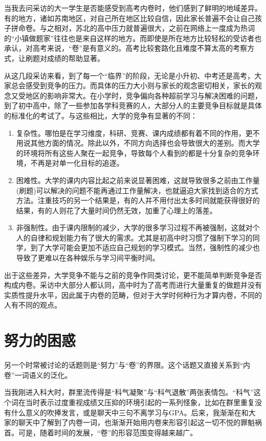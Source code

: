 \documentclass[UTF8,a4paper,fontset=windows,11pt,openany]{ctexbook}
\begin{document}
当我去问采访的大一学生是否能感受到高考内卷时，他们感到了鲜明的地域差异。有的地方，诸如苏南地区，对自己所在地区比较自信，因此家长普遍不会让自己孩子拼命卷。与之相对，苏北的高中压力就普遍很大，之前在网络上一度成为热词的“小镇做题家”往往也是来自这样的地方。而即使是所在地方比较轻松的受访者也承认，对高考来说，“卷”是有意义的。高考比较套路化且难度不算太高的考察方式，让刷题对成绩的帮助显著。

从这几段采访来看，到了每一个“临界”的阶段，无论是小升初、中考还是高考，大家总会感受到竞争的压力。而具体的压力大小则与家长的观念密切相关，家长的观念又受地区的影响非常大。在小学时，竞争偏向各种超前学习与解决困难的问题，到了初中高中，除了一些参加各学科竞赛的人，大部分人的主要竞争目标就是具体的标准化的考试了。与这些相比，大学的竞争有显著的不同：
\begin{enumerate}
    \item 复杂性。哪怕是在学习维度，科研、竞赛、课内成绩都有着不同的作用，更不用说其他方面的情况。除此以外，不同方向选择也会导致很大的差别。而大学的环境将所有这些人聚在一起竞争，导致每个人看到的都是十分复杂的竞争环境，不再是对单一化目标的追逐。
    \item 困难性。大学的课内内容比起之前来说显著困难，这就导致很多之前由工作量(刷题)可以解决的问题不能再通过工作量解决，也就逼迫大家找到适合的方式方法。注重技巧的另一个结果是，有的人并不用付出太多时间就能获得很好的结果，有的人则花了大量时间仍然无效，加重了心理上的落差。
    \item 非强制性。由于课内限制的减少，大学的很多学习过程不再被强制，这就对个人的自律和规划能力有了很大的需求。尤其是初高中时习惯了强制下学习的同学，到了大学可能会更加不适应自己规划的学习模式。当然，强制性的减少也导致了更难以在各种娱乐与学习间平衡时间。
\end{enumerate}

出于这些差异，大学竞争不能与之前的竞争作同类讨论，更不能简单判断竞争是否构成内卷。采访中大部分人都认同，高中时为了高考而进行大量重复的做题并没有实质性提升水平，因此属于内卷的范畴，但对于大学时何种行为才算内卷，不同的人有不同的观点。

\section{努力的困惑}
另一个时常被讨论的话题则是“努力”与“卷”的界限。这个话题又直接关系到“内卷”一词语义的泛化。

当我刚进入科大时，群里流传得是“科气凝聚”与“科气退散”两张表情包。“科气”这个词在当时表示过度重视成绩又压抑的环境引起的一系列怪象，比如在群里重复没有什么意义的吹捧发言，或是聊天中三句不离学习与GPA。后来，我渐渐在和大家的聊天中了解到了内卷一词，也渐渐开始用内卷来形容引起这一切不悦的罪魁祸首。可是，随着时间的发展，“卷”的形容范围变得越来越广。
\end{document}
